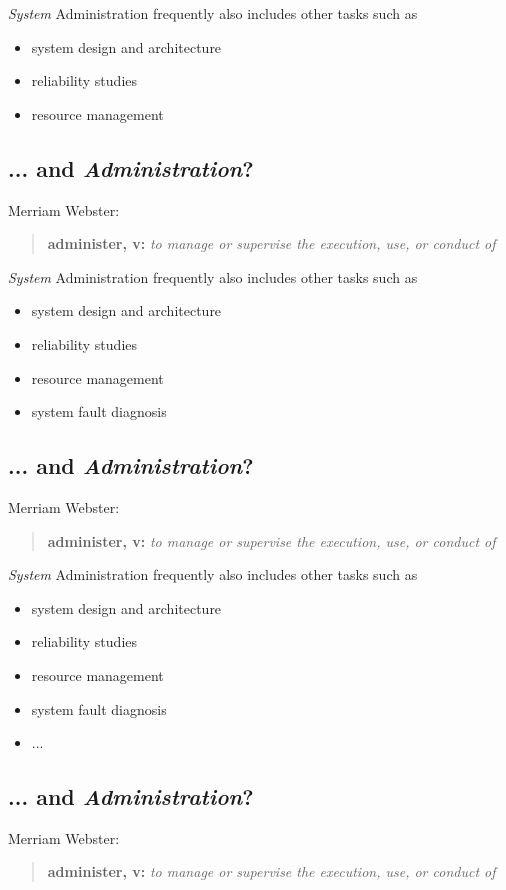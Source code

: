\documentclass[xga]{xdvislides}
\begin{document}
{\em System} Administration frequently also includes other tasks such as
\begin{itemize}
	\item system design and architecture
	\item reliability studies
	\item resource management
\end{itemize}

\subsection{... and {\em Administration}?}
Merriam Webster:
\begin{quote}
	{\bf administer, v:} {\em to manage or supervise the execution, use, or conduct of} \\
\end{quote}

{\em System} Administration frequently also includes other tasks such as
\begin{itemize}
	\item system design and architecture
	\item reliability studies
	\item resource management
	\item system fault diagnosis
\end{itemize}

\subsection{... and {\em Administration}?} Merriam Webster: \begin{quote} {\bf
administer, v:} {\em to manage or supervise the execution, use, or conduct of}
\\ \end{quote}

{\em System} Administration frequently also includes other tasks such as
\begin{itemize}
	\item system design and architecture
	\item reliability studies
	\item resource management
	\item system fault diagnosis
	\item ...
\end{itemize}


\subsection{... and {\em Administration}?}
Merriam Webster:
\begin{quote}
	{\bf administer, v:} {\em to manage or supervise the execution, use, or conduct of} \\
\end{quote}
\end{document}
